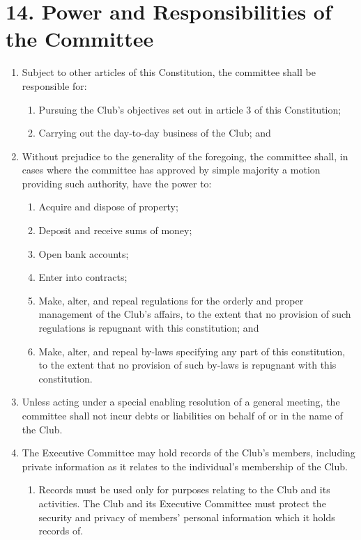 \documentclass[12pt]{article}
\begin{document}
\section{14. Power and Responsibilities of the Committee}
\begin{enumerate}[label=14.\arabic*]
\item Subject to other articles of this Constitution, the committee shall be responsible for:
    \begin{enumerate}[label=14.1.\arabic*]
    \item Pursuing the Club's objectives set out in article 3 of this Constitution;
    \item Carrying out the day-to-day business of the Club; and
    \end{enumerate}

\item Without prejudice to the generality of the foregoing, the committee shall, in cases where the committee has approved by simple majority a motion providing such authority, have the power to:
    \begin{enumerate}[label=14.2.\arabic*]
    \item Acquire and dispose of property;
    \item Deposit and receive sums of money;
    \item Open bank accounts;
    \item Enter into contracts;
    \item Make, alter, and repeal regulations for the orderly and proper management of the Club's affairs, to the extent that no provision of such regulations is repugnant with this constitution; and
    \item Make, alter, and repeal by-laws specifying any part of this constitution, to the extent that no provision of such by-laws is repugnant with this constitution.
    \end{enumerate}

\item Unless acting under a special enabling resolution of a general meeting, the committee shall not incur debts or liabilities on behalf of or in the name of the Club.

\item The Executive Committee may hold records of the Club's members, including private information as it relates to the individual's membership of the Club.
    \begin{enumerate}[label=14.4.\arabic*]
    \item Records must be used only for purposes relating to the Club and its activities. The Club and its Executive Committee must protect the security and privacy of members' personal information which it holds records of.
    \end{enumerate}


\end{enumerate}
\end{document}
